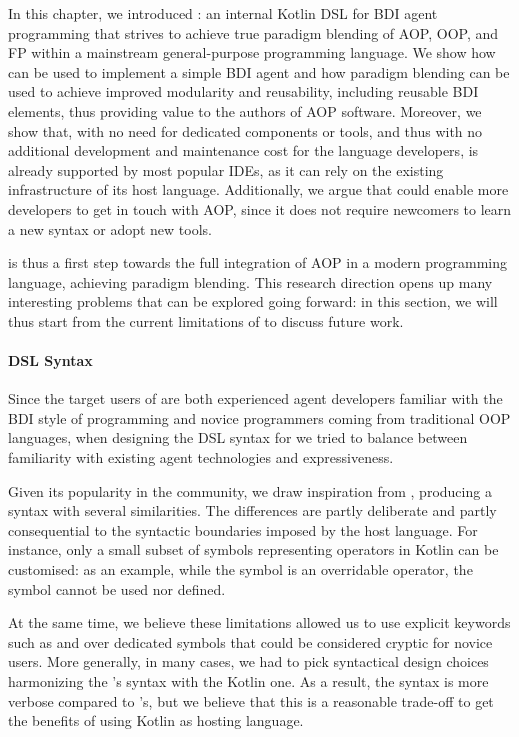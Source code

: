 In this chapter,
we introduced \jakta{}:
an internal Kotlin \ac{DSL} for \ac{BDI} agent programming that strives to achieve
true paradigm blending of \ac{AOP}, \ac{OOP}, and \ac{FP}
within a mainstream general-purpose programming language.
%
We show how \jakta{} can be used to implement a simple \ac{BDI} agent
and how paradigm blending can be used to achieve improved modularity
and reusability,
including reusable \ac{BDI} elements,
thus providing value to the authors of AOP software.
%
Moreover,
we show that,
with no need for dedicated components or tools,
and thus with no additional development and maintenance cost for the language developers,
\jakta{} is already supported by most popular IDEs,
as it can rely on the existing infrastructure of its host language.
%
Additionally,
we argue that \jakta{} could enable more developers to get in touch with AOP,
since it does not require newcomers to learn a new syntax or adopt new tools.

\jakta{} is thus a first step towards the full integration of \ac{AOP}
in a modern programming language,
achieving paradigm blending.
%
This research direction opens up many interesting problems that can be explored going forward:
in this section,
we will thus start from the current limitations of \jakta{}
to discuss future work.

\paragraph{DSL Syntax}

Since the target users of \jakta{} are both
experienced agent developers familiar with the \ac{BDI} style of programming
and novice programmers coming from traditional \ac{OOP} languages,
when designing the \ac{DSL} syntax for \jakta{}
we tried to balance between familiarity with existing agent technologies and expressiveness.

Given its popularity in the community,
we draw inspiration from \jason{},
producing a syntax with several similarities.
%
The differences are partly deliberate and partly
consequential to the syntactic boundaries imposed by
the host language.
%
For instance, only a small subset of symbols representing operators in Kotlin can be customised:
as an example,
while the symbol \kotlinInline{!} is an overridable operator,
the symbol  cannot be used nor defined.

At the same time, we believe these limitations allowed us to use explicit keywords
such as  and 
over dedicated symbols that could be considered cryptic for novice users.
%
More generally,
in many cases, we had to pick syntactical design choices harmonizing the \jason{}'s syntax with the Kotlin one.
%
As a result, the \jakta{} syntax is more verbose compared to \jason{}'s,
but we believe that this is a reasonable trade-off
to get the benefits of using Kotlin as hosting language.

